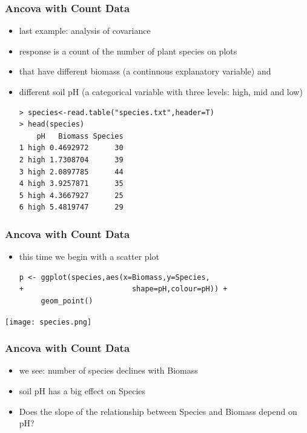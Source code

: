 \begin{frame}[fragile]\frametitle{Ancova with Count Data}
  \begin{itemize}
  \item last example: analysis of covariance
  \item response is a count of the number of plant species on plots 
  \item that have different biomass (a continuous explanatory variable) and
  \item different soil pH (a categorical variable with three levels: high, mid and low)
\begin{verbatim}
> species<-read.table("species.txt",header=T)
> head(species)
    pH   Biomass Species
1 high 0.4692972      30
2 high 1.7308704      39
3 high 2.0897785      44
4 high 3.9257871      35
5 high 4.3667927      25
6 high 5.4819747      29
\end{verbatim}
  \end{itemize}
\end{frame}

\begin{frame}[fragile]\frametitle{Ancova with Count Data}
  \begin{itemize}
  \item this time we begin with a scatter plot\small
\begin{verbatim}
p <- ggplot(species,aes(x=Biomass,y=Species,
+                         shape=pH,colour=pH)) +
     geom_point()
\end{verbatim}
  \end{itemize}
\begin{center}
\texttt{[image: species.png]}
\end{center}
\end{frame}

\begin{frame}[fragile]\frametitle{Ancova with Count Data}
  \begin{itemize}
\item we see: number of species declines with Biomass
\item soil pH has a big effect on Species 
\item Does the slope of the relationship between Species and Biomass depend
on pH?
  \end{itemize}
\end{frame}


